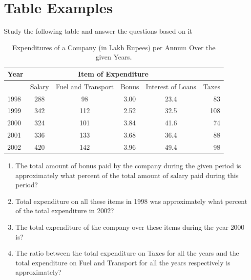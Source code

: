 \documentclass{article}
\begin{document}
\section{Table Examples}
Study the following table and answer the questions based on it 
\cite{float}

\begin{table}[h] 
\begin{tabular}{|l|c|c|c|c|r|}
\hline
Year & \multicolumn{4}{c}{Item of Expenditure} \\ \hline
& Salary & Fuel and Transport & Bonus & Interest of Loans & Taxes\\
 \hline
 1998 & 288 & 98 & 3.00 & 23.4 & 83 \\ 
  \hline
 1999 & 342 & 112 & 2.52 & 32.5 & 108 \\ 
  \hline
 2000 & 324 & 101 & 3.84 & 41.6 & 74 \\ 
 \hline
 2001 & 336 & 133 & 3.68 & 36.4 & 88 \\ 
 \hline
 2002 & 420 & 142 & 3.96 & 49.4 & 98 \\ 
 \hline
\end{tabular}
\caption{\label{Question I} Expenditures of a Company (in Lakh Rupees) per Annum Over the given Years.}
\end{table}


\begin{enumerate}
\item The total amount of bonus paid by the company during the given period is approximately what percent of the total amount of salary paid during this period?
\item Total expenditure on all these items in 1998 was approximately what percent of the total expenditure in 2002?
\item The total expenditure of the company over these items during the year 2000 is?
\item The ratio between the total expenditure on Taxes for all the years and the total expenditure on Fuel and Transport for all the years respectively is approximately?
\end{enumerate}
\end{document}
